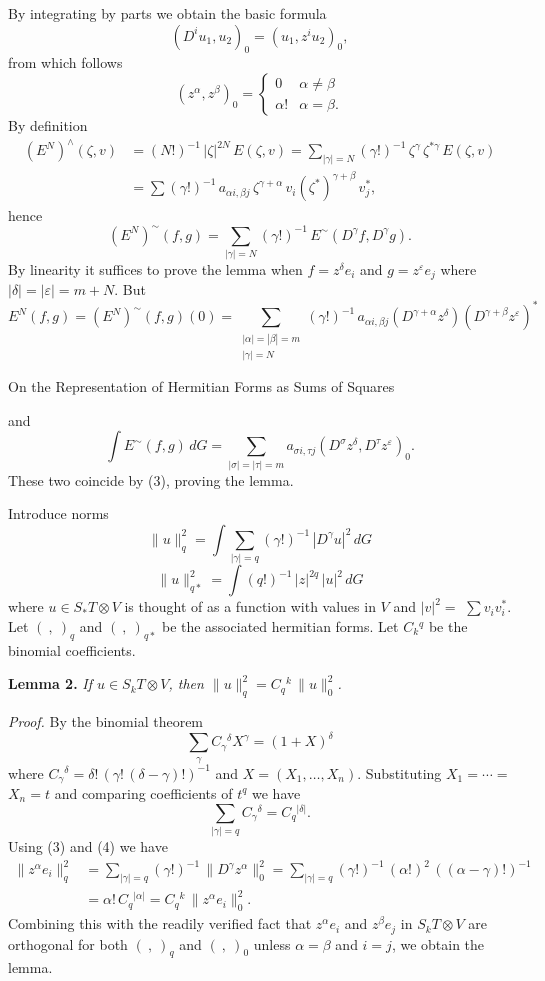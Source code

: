 By integrating by parts we obtain the basic formula
\[
(D^i u_1,u_2)_0=(u_1,z^i u_2)_0,
\]
from which follows
\[
(z^\alpha,z^\beta)_0=\begin{cases}0 & \alpha\neq\beta\\ \alpha! & \alpha=\beta.\end{cases}
\tag{3}
\]
By definition
\[
\begin{aligned}
(E^N)^\wedge(\zeta,v)&=(N!)^{-1}\,|\zeta|^{2N}\,E(\zeta,v)=\sum_{|\gamma|=N}(\gamma!)^{-1}\,\zeta^\gamma\,\zeta^{*\gamma}\,E(\zeta,v)\\
&=\sum(\gamma!)^{-1}\,a_{\alpha i,\beta j}\,\zeta^{\gamma+\alpha}\,v_i(\zeta^*)^{\gamma+\beta}\,v_j^*,
\end{aligned}
\]
hence
\[
(E^N)^\sim(f,g)=\sum_{|\gamma|=N}(\gamma!)^{-1}\,E^\sim(D^\gamma f,D^\gamma g).
\]
By linearity it suffices to prove the lemma when $f=z^\delta e_i$ and $g=z^\varepsilon e_j$
where $|\delta|=|\varepsilon|=m+N$. But
\[
E^N(f,g)=(E^N)^\sim(f,g)(0)=\sum_{\substack{|\alpha|=|\beta|=m\\ |\gamma|=N}}(\gamma!)^{-1}\,a_{\alpha i,\beta j}(D^{\gamma+\alpha}z^\delta)(D^{\gamma+\beta}z^\varepsilon)^*
\]


On the Representation of Hermitian Forms as Sums of Squares 

and
\[ \int E^{\sim}(f,g)\,dG = \sum_{|\sigma|=|\tau|=m} a_{\sigma i,\tau j}(D^{\sigma} z^{\delta}, D^{\tau} z^{\varepsilon})_0 . \]
These two coincide by (3), proving the lemma.

Introduce norms
\[ \|u\|_q^2 = \int \sum_{|\gamma|=q} (\gamma!)^{-1}\, |D^{\gamma} u|^2\, dG \]
\[ \|u\|_{q*}^2 = \int (q!)^{-1}\, |z|^{2q}\, |u|^2\, dG \]
where $u \in S_* T \otimes V$ is thought of as a function with values in $V$ and $|v|^2 =$
$\sum v_i v_i^*$. Let $(\ ,\ )_q$ and $(\ ,\ )_{q*}$ be the associated hermitian forms. Let
$C_k{}^q$ be the binomial coefficients.

\textbf{Lemma 2.} \emph{If $u \in S_k T \otimes V$, then $\|u\|_q^2 = C_q{}^k\, \|u\|_0^2$.}

\emph{Proof.} By the binomial theorem
\[ \sum_{\gamma} C_{\gamma}{}^{\delta} X^{\gamma} = (1+X)^{\delta} \]
where $C_{\gamma}{}^{\delta} = \delta!\,(\gamma!\,(\delta-\gamma)!)^{-1}$ and $X=(X_1,\dots,X_n)$. Substituting $X_1 = \cdots =$
$X_n = t$ and comparing coefficients of $t^q$ we have
\[ \sum_{|\gamma|=q} C_{\gamma}{}^{\delta} = C_q{}^{|\delta|}. \tag{4} \]
Using (3) and (4) we have
\[ \begin{aligned} \|z^{\alpha} e_i\|_q^2 &= \sum_{|\gamma|=q} (\gamma!)^{-1}\, \|D^{\gamma} z^{\alpha}\|_0^2 = \sum_{|\gamma|=q} (\gamma!)^{-1}\, (\alpha!)^2\, ((\alpha-\gamma)!)^{-1} \\
&= \alpha!\, C_q{}^{|\alpha|} = C_q{}^k\, \|z^{\alpha} e_i\|_0^2 . \end{aligned} \]
Combining this with the readily verified fact that $z^{\alpha} e_i$ and $z^{\beta} e_j$ in $S_k T \otimes V$
are orthogonal for both $(\ ,\ )_q$ and $(\ ,\ )_0$ unless $\alpha=\beta$ and $i=j$, we obtain
the lemma.

